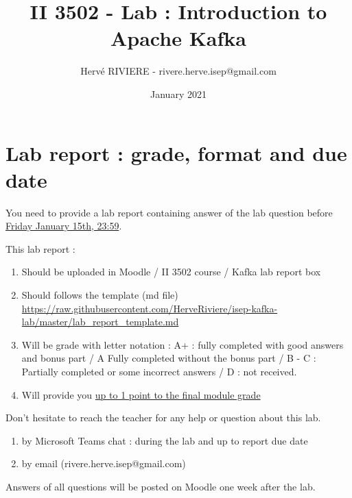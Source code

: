 \documentclass{article}
\newcounter{question}
\begin{document}
\title{II 3502 - Lab : Introduction to Apache Kafka}
\author{Hervé RIVIERE - rivere.herve.isep@gmail.com}
\date{January 2021}
\maketitle


\section{Lab report : grade, format and due date}

You need to provide a lab report containing answer of the lab question before \underline{Friday January 15th, 23:59}.

\vspace{5mm}
This lab report : 
\begin{enumerate}
\item Should be uploaded in Moodle / II 3502 course / Kafka lab report box
\item Should follows the template (md file) \url{https://raw.githubusercontent.com/HerveRiviere/isep-kafka-lab/master/lab_report_template.md}
\item Will be grade with letter notation : A+ : fully completed with good answers and bonus part / A Fully completed without the bonus part / B - C : Partially completed or some incorrect answers / D : not received.
\item Will provide you \underline{up to 1 point to the final module grade}
\end{enumerate}
\vspace{5mm}
Don't hesitate to reach the teacher for any help or question about this lab. 
\begin{enumerate}
    \item by Microsoft Teams chat  : during the lab and up to report due date
    \item by email (rivere.herve.isep@gmail.com)
\end{enumerate}

\vspace{5mm}

Answers of all questions will be posted on Moodle one week after the lab.
\end{document}
